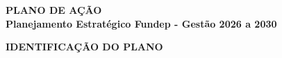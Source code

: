 \documentclass[12pt,a4paper]{article}
\newcommand{\secao}[1]{%
  \par\vspace{\dimexpr16pt-\parskip\relax}%
  {\noindent\bfseries\color{azulTitulo}\fontsize{13}{16}\selectfont #1}%
  \par\vspace{\dimexpr8pt-\parskip\relax}%
}
\begin{document}
\thispagestyle{empty}


\begin{center}
  \singlespacing
  {\bfseries\color{azulTitulo}\fontsize{17}{20}\selectfont PLANO DE AÇÃO}\\[6pt]
  {\bfseries\color{azulTitulo}\fontsize{13}{16}\selectfont Planejamento Estratégico Fundep - Gestão 2026 a 2030}
\end{center}

\secao{IDENTIFICAÇÃO DO PLANO}
\end{document}
